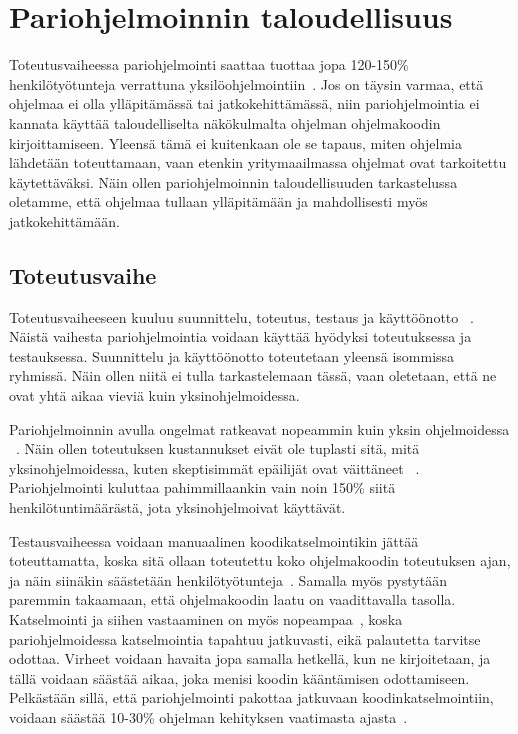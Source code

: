 \documentclass[finnish]{tktltiki2}
\theoremstyle{definition}
\theoremstyle{remark}
\begin{document}
\section{Pariohjelmoinnin taloudellisuus}

Toteutusvaiheessa pariohjelmointi saattaa tuottaa jopa 120-150\% henkilötyötunteja verrattuna yksilöohjelmointiin~\cite{williams01support}. Jos on täysin varmaa, että ohjelmaa ei olla ylläpitämässä tai jatkokehittämässä, niin pariohjelmointia ei kannata käyttää taloudelliselta näkökulmalta ohjelman ohjelmakoodin kirjoittamiseen. Yleensä tämä ei kuitenkaan ole se tapaus, miten ohjelmia lähdetään toteuttamaan, vaan etenkin yritymaailmassa ohjelmat ovat tarkoitettu käytettäväksi. Näin ollen pariohjelmoinnin taloudellisuuden tarkastelussa oletamme, että ohjelmaa tullaan ylläpitämään ja mahdollisesti myös jatkokehittämään.

\subsection{Toteutusvaihe}

Toteutusvaiheeseen kuuluu suunnittelu, toteutus, testaus ja käyttöönotto  ~\cite{sommerville1998requirements}. Näistä vaihesta pariohjelmointia voidaan käyttää hyödyksi toteutuksessa ja testauksessa. Suunnittelu ja käyttöönotto toteutetaan yleensä isommissa ryhmissä. Näin ollen niitä ei tulla tarkastelemaan tässä, vaan oletetaan, että ne ovat yhtä aikaa vieviä kuin yksinohjelmoidessa.

Pariohjelmoinnin avulla ongelmat ratkeavat nopeammin kuin yksin ohjelmoidessa ~\cite{costandbenefit}. Näin ollen toteutuksen kustannukset eivät ole tuplasti sitä, mitä yksinohjelmoidessa, kuten skeptisimmät epäilijät ovat väittäneet ~\cite{costandbenefit2}. Pariohjelmointi kuluttaa pahimmillaankin vain noin 150\% siitä henkilötuntimäärästä, jota yksinohjelmoivat käyttävät.

Testausvaiheessa voidaan manuaalinen koodikatselmointikin jättää toteuttamatta, koska sitä ollaan toteutettu koko ohjelmakoodin toteutuksen ajan, ja näin siinäkin säästetään henkilötyötunteja~\cite{nawrocki01exp}. Samalla myös pystytään paremmin takaamaan, että ohjelmakoodin laatu on vaadittavalla tasolla. Katselmointi ja siihen vastaaminen on myös nopeampaa~\cite{costandbenefit2}, koska pariohjelmoidessa katselmointia tapahtuu jatkuvasti, eikä palautetta tarvitse odottaa. Virheet voidaan havaita jopa samalla hetkellä, kun ne kirjoitetaan, ja tällä voidaan säästää aikaa, joka menisi koodin kääntämisen odottamiseen. Pelkästään sillä, että pariohjelmointi pakottaa jatkuvaan koodinkatselmointiin, voidaan säästää 10-30\% ohjelman kehityksen vaatimasta ajasta~\cite{gilb1993software}.
\end{document}
